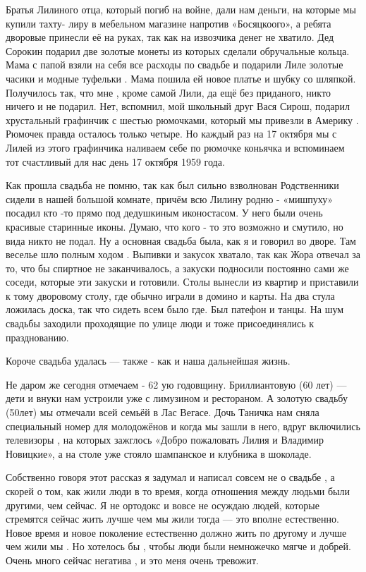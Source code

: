 Братья Лилиного отца, который погиб на войне,  дали нам деньги, на которые мы
купили тахту- лиру в  мебельном  магазине напротив «Босяцкоого», а ребята
дворовые принесли её на руках, так как на извозчика денег не хватило. Дед
Сорокин подарил две золотые монеты из которых сделали обручальные кольца. Мама
с папой взяли на себя все расходы по свадьбе и подарили Лиле  золотые часики и
модные туфельки . Мама пошила ей новое платье и шубку со шляпкой. Получилось
так, что мне , кроме самой Лили, да ещё без приданого, никто ничего и не
подарил. Нет, вспомнил, мой школьный друг Вася Сирош, подарил хрустальный
графинчик с шестью рюмочками, который мы привезли в Америку . Рюмочек правда
осталось только четыре. Но каждый раз на 17 октября мы с Лилей из этого
графинчика  наливаем себе по рюмочке коньячка и вспоминаем тот счастливый для
нас день 17 октября 1959 года.

Как прошла свадьба не помню, так как был сильно взволнован Родственники сидели
в нашей большой комнате, причём всю Лилину родню - «мишпуху»  посадил кто -то
прямо под дедушкиным  иконостасом. У него были очень красивые  старинные иконы.
Думаю, что кого - то это возможно и смутило, но вида никто не подал. Ну а
основная свадьба была, как я и говорил во дворе. Там веселье шло полным ходом .
Выпивки и закусок хватало, так как Жора отвечал за  то, что бы спиртное не
заканчивалось, а закуски подносили постоянно сами же соседи, которые эти
закуски и готовили. Столы  вынесли из квартир и приставили к тому дворовому
столу, где обычно  играли в домино и карты. На два стула ложилась доска, так
что сидеть всем было где. Был патефон и танцы. На шум свадьбы заходили
проходящие по улице люди и тоже присоединялись к празднованию. 

Короче свадьба удалась — также -  как и наша дальнейшая жизнь.

Не даром же сегодня отмечаем  - 62 ую годовщину.  Бриллиантовую (60 лет) — дети
и внуки нам устроили уже с лимузином и рестораном. А золотую свадьбу (50лет)
мы отмечали всей семьёй в Лас Вегасе. Дочь Таничка нам сняла специальный номер
для молодожёнов и когда мы зашли в него, вдруг включились телевизоры , на
которых  зажглось  «Добро пожаловать Лилия и Владимир Новицкие», а на столе уже
стояло шампанское и клубника в шоколаде.

Собственно говоря  этот рассказ я задумал и написал  совсем не  о свадьбе , а
скорей о том, как жили люди в то время, когда отношения между людьми были
другими, чем сейчас. Я не ортодокс и вовсе не осуждаю людей, которые стремятся
сейчас жить лучше чем мы жили тогда — это вполне естественно. Новое время и
новое поколение  естественно должно жить по другому и лучше чем жили  мы . Но
хотелось бы , чтобы люди были немножечко мягче и добрей. Очень много  сейчас
негатива , и это меня очень тревожит.

